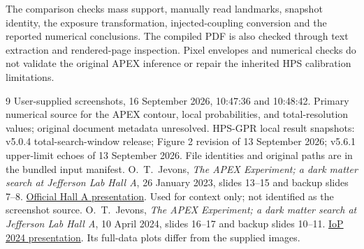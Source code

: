 \documentclass[10pt,letterpaper]{article}
\begin{document}
The comparison checks mass support, manually read landmarks, snapshot identity,
the exposure transformation, injected-coupling conversion and the reported
numerical conclusions. The compiled PDF is also checked through text extraction
and rendered-page inspection. Pixel envelopes and numerical checks do not
validate the original APEX inference or repair the inherited HPS calibration
limitations.

\begin{thebibliography}{9}\small
{} User-supplied screenshots, 16 September 2026, 10:47:36 and
10:48:42. Primary numerical source for the APEX contour, local probabilities,
and total-resolution values; original document metadata unresolved.
 HPS-GPR local result snapshots: v5.0.4 total-search-window release;
Figure 2 revision of 13 September 2026; v5.6.1 upper-limit echoes of 13 September
2026. File identities and original paths are in the bundled input manifest.
 O.~T.~Jevons, \emph{The APEX Experiment; a dark matter search
at Jefferson Lab Hall A}, 26 January 2023, slides 13--15 and backup slides 7--8.
\href{https://indico.jlab.org/event/602/contributions/11893/attachments/8838/12776/APEX_HallAWinter23Update.pdf}{Official Hall A presentation}.
Used for context only; not identified as the screenshot source.
 O.~T.~Jevons, \emph{The APEX Experiment; a dark matter search
at Jefferson Lab Hall A}, 10 April 2024, slides 16--17 and backup slides 10--11.
\href{https://indico.cern.ch/event/1388874/contributions/5878795/attachments/2833948/4951963/IoP24_APEX.pdf}{IoP 2024 presentation}.
Its full-data plots differ from the supplied images.
\end{thebibliography}
\end{document}
